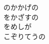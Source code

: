 \documentclass[10pt,b5j]{tarticle} %
\begin{document}
\begin{enumerate}
\begin{minipage}[c]{\blocksize}
        \vspace{\linespace}
        \item
        のかかげの\\
        をかざすの\\
        をめしが\\
        こぞりてうの
    
    \end{minipage}
\end{enumerate} %
\end{document}
